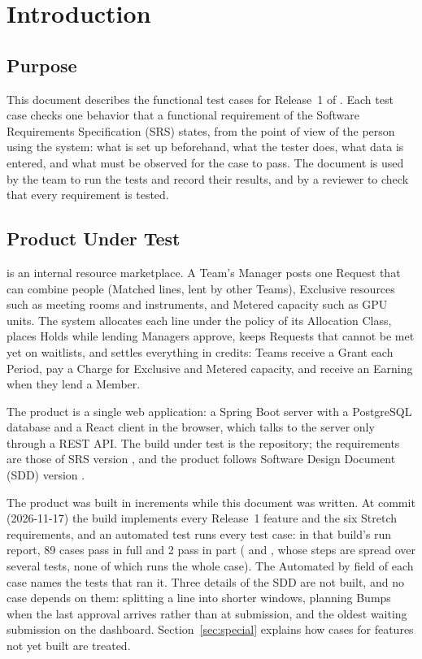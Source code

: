 \section{Introduction}\label{sec:intro}

\subsection{Purpose}
This document describes the functional test cases for Release~1 of \SRSproduct. Each test case checks one behavior that a functional requirement of the Software Requirements Specification (SRS) states, from the point of view of the person using the system: what is set up beforehand, what the tester does, what data is entered, and what must be observed for the case to pass. The document is used by the team to run the tests and record their results, and by a reviewer to check that every requirement is tested.

\subsection{Product Under Test}\label{sec:product}
\SRSproduct{} is an internal resource marketplace. A Team's Manager posts one Request that can combine people (Matched lines, lent by other Teams), Exclusive resources such as meeting rooms and instruments, and Metered capacity such as GPU units. The system allocates each line under the policy of its Allocation Class, places Holds while lending Managers approve, keeps Requests that cannot be met yet on waitlists, and settles everything in credits: Teams receive a Grant each Period, pay a Charge for Exclusive and Metered capacity, and receive an Earning when they lend a Member.

The product is a single web application: a Spring Boot server with a PostgreSQL database and a React client in the browser, which talks to the server only through a REST API. The build under test is the  repository; the requirements are those of SRS version \SRSversion, and the product follows Software Design Document (SDD) version \SDDversion.

The product was built in increments while this document was written. At commit  (2026-11-17) the build implements every Release~1 feature and the six Stretch requirements, and an automated test runs every test case: in that build's run report, 89 cases pass in full and 2 pass in part ( and , whose steps are spread over several tests, none of which runs the whole case). The Automated by field of each case names the tests that ran it. Three details of the SDD are not built, and no case depends on them: splitting a line into shorter windows, planning Bumps when the last approval arrives rather than at submission, and the oldest waiting submission on the dashboard. Section~\ref{sec:special} explains how cases for features not yet built are treated.

